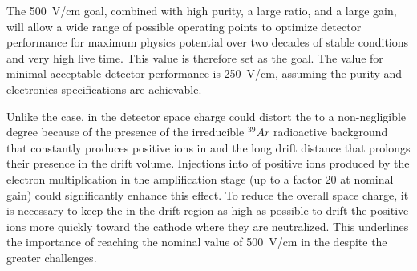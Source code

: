 The \SI{500}{\V/\cm} \efield goal, combined with high  purity, a large  ratio, and a large  gain, will allow a wide range of possible operating points to optimize detector performance 
for maximum physics potential over two decades of stable conditions and very high live time. 
This value is therefore set as the goal. 
The value for minimal acceptable detector performance is \SI{250}{\V/\cm}, assuming the purity and electronics specifications are achievable. %

Unlike the  case, in the  detector space charge could %
distort the \efield to a non-negligible degree 
because of the presence of the irreducible $^{39}Ar$ radioactive background that constantly produces positive ions in  and the long drift distance that prolongs their %
presence in the drift volume. %
Injections into  of positive ions produced by the electron multiplication in the  amplification stage (up to a factor \num{20} at nominal  gain) could significantly enhance this effect. 
To reduce the overall space charge, it is necessary to keep the \efield in the drift region as high as possible to drift the positive ions more quickly toward the cathode where they are neutralized. This underlines the importance of reaching the nominal value of \SI{500}{\V/\cm} in the  despite the greater challenges. 

